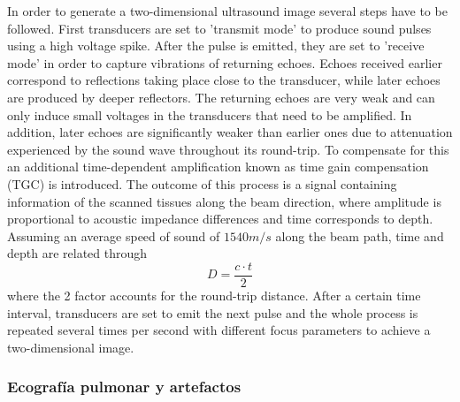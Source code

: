 \documentclass[11pt]{article} %
\begin{document}
	In order to generate a two-dimensional ultrasound image several steps have to be followed. First transducers are set to 'transmit mode' to produce sound pulses using a high voltage spike. After the pulse is emitted, they are set to 'receive mode' in order to capture vibrations of returning echoes. Echoes received earlier correspond to reflections taking place close to the transducer, while later echoes are produced by deeper reflectors.  The returning echoes are very weak and can only induce small voltages in the transducers that need to be amplified. In addition, later echoes are significantly weaker than earlier ones due to attenuation experienced by the sound wave throughout its round-trip. To compensate for this an additional time-dependent amplification known as time gain compensation (TGC) is introduced. The outcome of this process is a signal containing information of the scanned tissues along the beam direction, where amplitude is proportional to acoustic impedance differences and time corresponds to depth. Assuming an average speed of sound of $1540 m/s$ along the beam path, time and depth are related through \[ D = \frac{c·t}{2} \] where the 2 factor accounts for the round-trip distance. After a certain time interval, transducers are set to emit the next pulse and the whole process is repeated several times per second with different focus parameters to achieve a two-dimensional image. 

\subsubsection{Ecografía pulmonar y artefactos}

\end{document}
